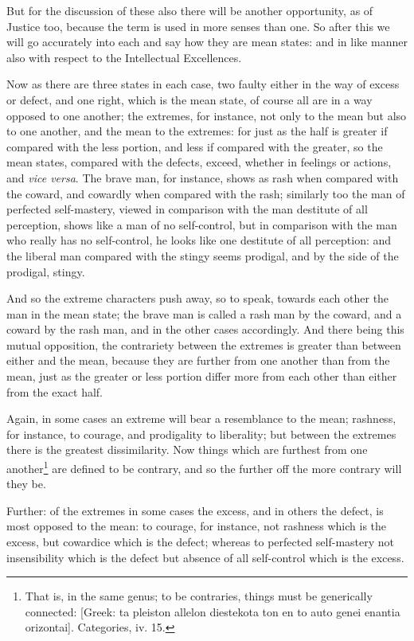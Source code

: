 But for the discussion of these also there will be another opportunity, as of
Justice too, because the term is used in more senses than one. So after this we
will go accurately into each and say how they are mean states: and in like
manner also with respect to the Intellectual Excellences.


Now as there are three states in each case, two faulty either in the way of
excess or defect, and one right, which is the mean state, of course all are in
a way opposed to one another; the extremes, for instance, not only to the mean
but also to one another, and the mean to the extremes: for just as the half is
greater if compared with the less portion, and less if compared with the
greater, so the mean states, compared with the defects, exceed, whether in
feelings or actions, and \emph{vice versa}. The brave man, for instance, shows
as rash when compared with the coward, and cowardly when compared with the
rash; similarly too the man of perfected self-mastery, viewed in comparison
with the man destitute of all perception, shows like a man of no self-control,
but in comparison with the man who really has no self-control, he looks like
one destitute of all perception: and the liberal man compared with the stingy
seems prodigal, and by the side of the prodigal, stingy.

And so the extreme characters push away, so to speak, towards each other the
man in the mean state; the brave man is called a rash man by the coward, and a
coward by the rash man, and in the other cases accordingly. And there being
this mutual opposition, the contrariety between the extremes is greater than
between either and the mean, because they are further from one another than
from the mean, just as the greater or less portion differ more from each other
than either from the exact half.

Again, in some cases an extreme will bear a resemblance to the mean; rashness,
for instance, to courage, and prodigality to liberality; but between the
extremes there is the greatest dissimilarity. Now things which are furthest
from one another\footnote{That is, in the same genus; to be contraries, things must be
generically connected: [Greek: ta pleiston allelon diestekota ton en to
auto genei enantia orizontai]. Categories, iv. 15.}
are defined to be contrary, and so the further off the more contrary will they
be.

Further: of the extremes in some cases the excess, and in others the defect, is
most opposed to the mean: to courage, for instance, not rashness which is the
excess, but cowardice which is the defect; whereas to perfected self-mastery
not insensibility which is the defect but absence of all self-control which is
the excess.

